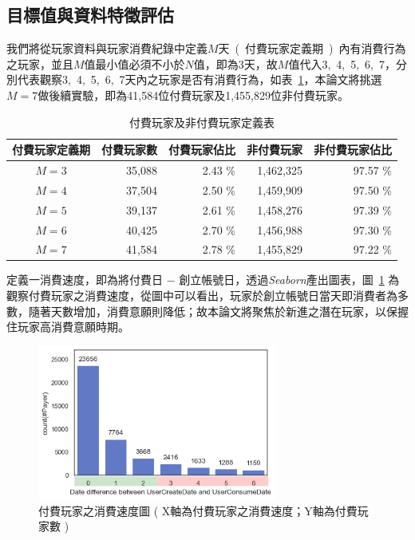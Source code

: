 \subsection{目標值與資料特徵評估}
\label{subsec:ClassAndFeatureEvaluation}

我們將從玩家資料與玩家消費紀錄中定義$M$天\ (\ 付費玩家定義期\ )\ 內有消費行為之玩家，並且$M$值最小值必須不小於$N$值，即為3天，故$M$值代入3,\ 4,\ 5,\ 6,\ 7，分別代表觀察3,\ 4,\ 5,\ 6,\ 7天內之玩家是否有消費行為，如表~\ref{tab:PayerAndNonPayerDefinition}，本論文將挑選$M = 7$做後續實驗，即為41,584位付費玩家及1,455,829位非付費玩家。

\begin{table}[!htb]
	\centering
	\begin{tabular}{crrrr}
	\hline \hline
	付費玩家定義期 & 付費玩家數 & 付費玩家佔比 & 非付費玩家 & 非付費玩家佔比 \\
    \hline \hline
    $M = 3$ & 35,088 & 2.43 \% & 1,462,325 & 97.57 \% \\
    \hline
    $M = 4$ & 37,504 & 2.50 \% & 1,459,909 & 97.50 \% \\
    \hline
    $M = 5$ & 39,137 & 2.61 \% & 1,458,276 & 97.39 \% \\
    \hline
    $M = 6$ & 40,425 & 2.70 \% & 1,456,988 & 97.30 \% \\
    \hline
    \rowcolor[HTML]{C0C0C0}
    $M = 7$ & 41,584 & 2.78 \% & 1,455,829 & 97.22 \% \\
    \hline \hline
	\end{tabular}
	\caption[付費玩家及非付費玩家定義表]{付費玩家及非付費玩家定義表}
	\label{tab:PayerAndNonPayerDefinition}
\end{table}

定義一消費速度，即為將付費日 $-$ 創立帳號日，透過\emph{Seaborn}產出圖表，圖~\ref{fig:eva_PlayerConsumePeriod} 為觀察付費玩家之消費速度，從圖中可以看出，玩家於創立帳號日當天即消費者為多數，隨著天數增加，消費意願則降低；故本論文將聚焦於新進之潛在玩家，以保握住玩家高消費意願時期。

\begin{figure}[!htb]
    \begin{center}
      \includegraphics[width=0.7\textwidth]{figures/evaluation/Image_PlayerConsumePeriod.png}
      \caption[付費玩家之消費速度圖]{付費玩家之消費速度圖 ( X軸為付費玩家之消費速度；Y軸為付費玩家數 ) }
      \label{fig:eva_PlayerConsumePeriod}
    \end{center}
\end{figure}
\newpage

